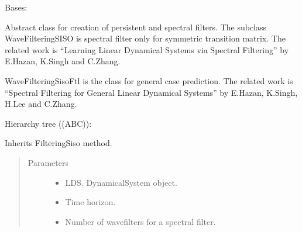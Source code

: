\documentclass[letterpaper,10pt,english]{sphinxmanual}
\begin{document}
\begin{fulllineitems}
\label{\detokenize{LDS.LDS.filters:LDS.LDS.filters.wave_filtering_siso_abs.WaveFilteringSisoAbs}}
\sphinxAtStartPar
Bases: {\hyperref[\detokenize{LDS.LDS.filters:LDS.LDS.filters.filtering_siso.FilteringSiso}]{}}

\sphinxAtStartPar
Abstract class for creation of persistent and spectral filters.
The subclass WaveFilteringSISO is spectral filter only for symmetric transition matrix.
The related work is “Learning Linear Dynamical Systems via Spectral Filtering”
by E.Hazan, K.Singh and C.Zhang.

\sphinxAtStartPar
WaveFilteringSisoFtl is the class for general case prediction.
The related work is “Spectral Filtering for General Linear Dynamical Systems”
by E.Hazan, K.Singh, H.Lee and C.Zhang.

\sphinxAtStartPar
Hierarchy tree ((ABC)):

\noindent{}

\sphinxAtStartPar
Inherits FilteringSiso method.
\begin{quote}\begin{description}
\item[{Parameters}] \leavevmode\begin{itemize}
\item {} 
\sphinxAtStartPar
{} \textendash{} LDS. DynamicalSystem object.

\item {} 
\sphinxAtStartPar
{} \textendash{} Time horizon.

\item {} 
\sphinxAtStartPar
{} \textendash{} Number of wave\sphinxhyphen{}filters for a spectral filter.

\end{itemize}

\end{description}\end{quote}


\end{fulllineitems}
\end{document}
